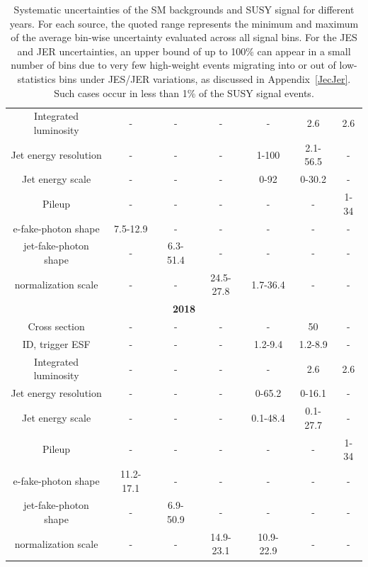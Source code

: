 \begin{table}[h]
{\begin{tabular}{|c||c|c|c|c|c|c|}
  Integrated luminosity & - & - & - & - & 2.6 & 2.6 \\
  Jet energy resolution & - & - & - & 1-100 & 2.1-56.5 & - \\
  Jet energy scale & - & - & - & 0-92 & 0-30.2 & - \\
  Pileup & - & - & - & - & - & 1-34 \\
  e-fake-photon shape & 7.5-12.9 & - & - & - & - & - \\
  jet-fake-photon shape & - & 6.3-51.4 & - & - & - & - \\
  normalization scale & - & - & 24.5-27.8 & 1.7-36.4 & - & - \\
\hline
\multicolumn{7}{|c|}{\textbf{2018}} \\
\hline
  Cross section & - & - & - & - & 50 & - \\
  ID, trigger ESF & - & - & - & 1.2-9.4 & 1.2-8.9 & - \\
  Integrated luminosity & - & - & - & - & 2.6 & 2.6 \\
  Jet energy resolution & - & - & - & 0-65.2 & 0-16.1 & - \\
  Jet energy scale & - & - & - & 0.1-48.4 & 0.1-27.7 & - \\
  Pileup & - & - & - & - & - & 1-34 \\
  e-fake-photon shape & 11.2-17.1 & - & - & - & - & - \\
  jet-fake-photon shape & - & 6.9-50.9 & - & - & - & - \\
  normalization scale & - & - & 14.9-23.1 & 10.9-22.9 & - & - \\
\hline

\end{tabular}
}
\caption{Systematic uncertainties of the SM backgrounds and SUSY signal for different years. For each source, the quoted range represents the minimum and maximum of the average bin-wise uncertainty evaluated across all signal bins. For the JES and JER uncertainties, an upper bound of up to 100\% can appear in a small number of bins due to very few high-weight events migrating into or out of low-statistics bins under JES/JER variations, as discussed in  Appendix~\ref{JecJer}. Such cases occur in less than 1\% of the SUSY signal events. }
\label{table:ch4-systematic}
\end{table}
